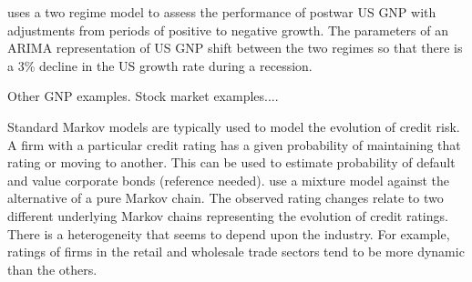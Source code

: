 \documentclass[12pt, a4paper, oneside]{article} %
\begin{document}
\citet{Hamilton1989} uses a two regime model to assess the performance of postwar US GNP with adjustments from periods of positive to negative growth. The parameters of an ARIMA representation of US GNP shift between the two regimes so that there is a 3\% decline in the US growth rate during a recession.  





Other GNP examples.  Stock market examples....

Standard Markov models are typically used to model the evolution of credit risk.  A firm with a particular credit rating has a given probability of maintaining that rating or moving to another.  This can be used to estimate probability of default and value corporate bonds (reference needed).  \citet{frydman2008credit} use a mixture model against the alternative of a pure Markov chain. The observed rating changes relate to two different underlying Markov chains representing the evolution of credit ratings.  There is a heterogeneity that seems to depend upon the industry.  For example, ratings of firms in the retail and wholesale trade sectors tend to be more dynamic than the others. 

\end{document}
